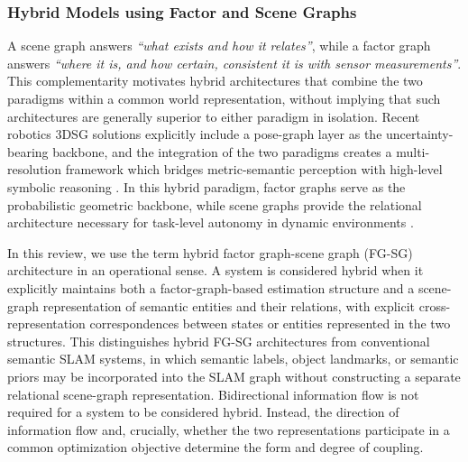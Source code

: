 \subsubsection{Hybrid Models using Factor and Scene Graphs}\label{sec:background_hybrid}
A scene graph answers \textit{``what exists and how it relates''}, while a factor graph answers \textit{``where it is, and how certain, consistent it is with sensor measurements''}.
This complementarity motivates hybrid architectures that combine the two paradigms within a common world representation, without implying that such architectures are generally superior to either paradigm in isolation.
Recent robotics 3DSG solutions explicitly include a pose-graph layer as the uncertainty-bearing backbone, and the integration of the two paradigms creates a multi-resolution framework which bridges metric-semantic perception with high-level symbolic reasoning \cite{rosinol_kimera_2021} \cite{bavle_situational_2022}.
In this hybrid paradigm, factor graphs serve as the probabilistic geometric backbone, while scene graphs provide the relational architecture necessary for task-level autonomy in dynamic environments \cite{catalano_3d_2025} \cite{rosinol_3d_2020}.

In this review, we use the term hybrid factor graph-scene graph (FG-SG) architecture in an operational sense. 
A system is considered hybrid when it explicitly maintains both a factor-graph-based estimation structure and a scene-graph representation of semantic entities and their relations, with explicit cross-representation correspondences between states or entities represented in the two structures.
This distinguishes hybrid FG-SG architectures from conventional semantic SLAM systems, in which semantic labels, object landmarks, or semantic priors may be incorporated into the SLAM graph without constructing a separate relational scene-graph representation.
Bidirectional information flow is not required for a system to be considered hybrid. Instead, the direction of information flow and, crucially, whether the two representations participate in a common optimization objective determine the form and degree of coupling.


